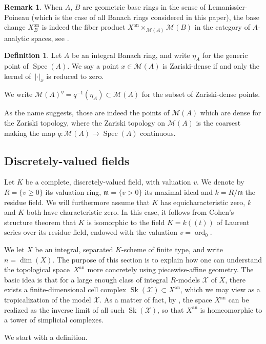 \documentclass[JEP,XML,SOM,Unicode,published]{cedram}
\newcommand{\lpr}{(\!(}
\newcommand{\rpr}{)\!)}
\theoremstyle{definition}
\newtheorem{defn}[equation]{Definition}
\newtheorem{rem}[equation]{Remark}
\newcommand \M {\mathscr {M}}
\newcommand \X {\mathscr{X}}
\newcommand{\an}{\mathrm{an}}
\DeclareMathOperator{\ord}{ord}
\DeclareMathOperator{\Sk}{Sk}
\DeclareMathOperator{\Sp}{Spec}
\begin{document}
\begin{rem} When $A$, $B$ are geometric base rings in the sense of Lemanissier-Poineau \cite[Def.\,3.3.8]{LP} (which is the case of all Banach rings considered in this paper), the base change $X^{\an}_B$ is indeed the fiber product $X^{\an} \times_{\M(A)} \M(B)$ in the category of $A$-analytic spaces, see \cite[\S\S4.2, 4.3]{LP}.
\end{rem}
\begin{defn} \label{def Mbir}
Let $A$ be an integral Banach ring, and write $\eta_A$ for the generic point of $\Sp(A)$. We say a point $x \in \M(A)$ is Zariski-dense if and only the kernel of~$\lvert \cdot \rvert_x$ is reduced to zero.

We write $\M(A)^{\eta} = q^{-1}(\eta_A) \subset \M(A)$ for the subset of Zariski-dense points.
\end{defn}
As the name suggests, those are indeed the points of $\M(A)$ which are dense for the Zariski topology, where the Zariski topology on $\M(A)$ is the coarsest making the map $q: \M(A) \to \Sp (A)$ continuous.
\subsection{Discretely-valued fields}\label{section DVF}
Let $K$ be a complete, discretely-valued field, with valuation $v$. We denote by $R= \{ v \ge 0 \}$ its valuation ring, $\mathfrak{m} = \{ v>0 \}$ its maximal ideal and $k= R/ \mathfrak{m}$ the residue field. We will furthermore assume that $K$ has equicharacteristic zero, \ie $k$ and $K$ both have characteristic zero. In this case, it follows from Cohen's structure theorem that $K$ is isomorphic to the field $K =k\lpr t\rpr$ of Laurent series over its residue field, endowed with the valuation $v= \ord_0$.

We let $X$ be an integral, separated $K$-scheme of finite type, and write $n = \dim(X)$. The purpose of this section is to explain how one can understand the topological space~$X^{\an}$ more concretely using piecewise-affine geometry. The basic idea is that for a large enough class of integral $R$-models $\X$ of $X$, there exists a finite-dimensional cell complex $\Sk(\X) \subset X^{\an}$, which we may view as a tropicalization of the model $\X$. As a matter of fact, by \cite[Th.\,10]{KontsevichSoibelman}, the space $X^{\an}$ can be realized as the inverse limit of all such $\Sk(\X)$, so that $X^{\an}$ is homeomorphic to a tower of simplicial complexes.

We start with a definition.
\end{document}
